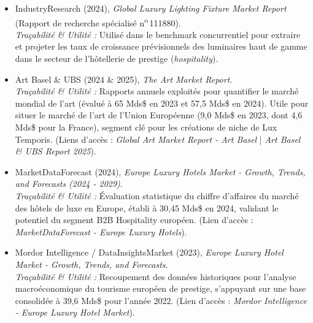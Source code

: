 \documentclass[11pt,a4paper]{article}
\begin{document}
\begin{itemize}
  \item IndustryResearch (2024), \textit{Global Luxury Lighting Fixture Market Report} (Rapport de recherche spécialisé n\textsuperscript{o}\,111880). \\
  \textit{Traçabilité \& Utilité :} Utilisé dans le benchmark concurrentiel pour extraire et projeter les taux de croissance prévisionnels des luminaires haut de gamme dans le secteur de l'hôtellerie de prestige (\textit{hospitality}).
  
  \item Art Basel \& UBS (2024 \& 2025), \textit{The Art Market Report}. \\
  \textit{Traçabilité \& Utilité :} Rapports annuels exploités pour quantifier le marché mondial de l'art (évalué à 65 Mds\$ en 2023 et 57,5 Mds\$ en 2024). Utile pour situer le marché de l’art de l’Union Européenne (9,0 Mds\$ en 2023, dont 4,6 Mds\$ pour la France), segment clé pour les créations de niche de Lux Temporis. (Liens d'accès : \textit{Global Art Market Report - Art Basel} | \textit{Art Basel \& UBS Report 2025}).
  
  \item MarketDataForecast (2024), \textit{Europe Luxury Hotels Market - Growth, Trends, and Forecasts (2024 - 2029)}. \\
  \textit{Traçabilité \& Utilité :} Évaluation statistique du chiffre d'affaires du marché des hôtels de luxe en Europe, établi à 30,45 Mds\$ en 2024, validant le potentiel du segment B2B Hospitality européen. (Lien d'accès : \textit{MarketDataForecast - Europe Luxury Hotels}).
  
  \item Mordor Intelligence / DataInsightsMarket (2023), \textit{Europe Luxury Hotel Market - Growth, Trends, and Forecasts}. \\
  \textit{Traçabilité \& Utilité :} Recoupement des données historiques pour l'analyse macroéconomique du tourisme européen de prestige, s'appuyant sur une base consolidée à 39,6 Mds\$ pour l'année 2022. (Lien d'accès : \textit{Mordor Intelligence - Europe Luxury Hotel Market}).
\end{itemize}
\end{document}
